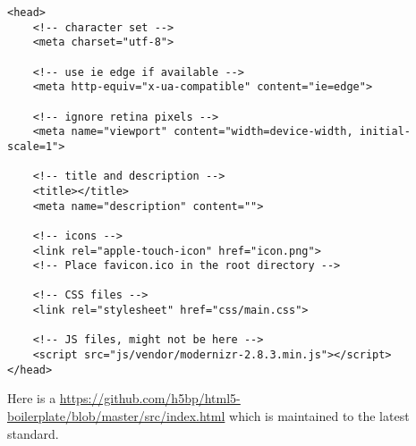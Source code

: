 \begin{verbatim}
<head>
    <!-- character set -->
    <meta charset="utf-8">

    <!-- use ie edge if available -->
    <meta http-equiv="x-ua-compatible" content="ie=edge">

    <!-- ignore retina pixels -->
    <meta name="viewport" content="width=device-width, initial-scale=1">

    <!-- title and description -->
    <title></title>
    <meta name="description" content="">

    <!-- icons -->
    <link rel="apple-touch-icon" href="icon.png">
    <!-- Place favicon.ico in the root directory -->

    <!-- CSS files -->
    <link rel="stylesheet" href="css/main.css">

    <!-- JS files, might not be here -->
    <script src="js/vendor/modernizr-2.8.3.min.js"></script>
</head>
\end{verbatim}

Here is a \href{link to the code for HTML5 Boilerplate}{https://github.com/h5bp/html5-boilerplate/blob/master/src/index.html} which is maintained to the latest standard.

